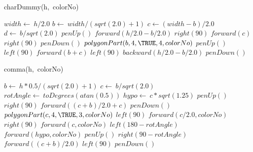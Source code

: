 \documentclass[a4paper,10pt]{article}
\begin{document}
\begin{algorithm}
\caption{charDummy(h,\ colorNo)}
\begin{algorithmic}[5]

\STATE {}
\STATE {}
  \STATE \(width\gets\ h/2.0\)
  \STATE \(b\gets\ width/(sqrt(2.0)+1)\)
  \STATE \(c\gets(width-b)/2.0\)
  \STATE \(d\gets\ b/sqrt(2.0)\)
  \STATE \(penUp()\)
  \STATE \(forward(h/2.0-b/2.0)\)
  \STATE \(right(90)\)
  \STATE \(forward(c)\)
  \STATE \(right(90)\)
  \STATE \(penDown()\)
  \STATE \(polygonPart(b,4,\TRUE,4,colorNo)\)
  \STATE \(penUp()\)
  \STATE \(left(90)\)
  \STATE \(forward(b+c)\)
  \STATE \(left(90)\)
  \STATE \(backward(h/2.0-b/2.0)\)
  \STATE \(penDown()\)

\end{algorithmic}
\end{algorithm}


\begin{algorithm}
\caption{comma(h,\ colorNo)}
\begin{algorithmic}[5]

\STATE {}
\STATE {}
  \STATE \(b\gets\ h*0.5/(sqrt(2.0)+1)\)
  \STATE \(c\gets\ b/sqrt(2.0)\)
  \STATE \(rotAngle\gets\ toDegrees(atan(0.5))\)
  \STATE \(hypo\gets\ c*sqrt(1.25)\)
  \STATE \(penUp()\)
  \STATE \(right(90)\)
  \STATE \(forward((c+b)/2.0+c)\)
  \STATE \(penDown()\)
  \STATE {}
  \STATE {}
  \STATE \(polygonPart(c,4,\TRUE,3,colorNo)\)
  \STATE \(left(90)\)
  \STATE \(forward(c/2.0,colorNo)\)
  \STATE \(right(90)\)
  \STATE \(forward(c,colorNo)\)
  \STATE \(left(180-rotAngle)\)
  \STATE \(forward(hypo,colorNo)\)
  \STATE \(penUp()\)
  \STATE \(right(90-rotAngle)\)
  \STATE \(forward((c+b)/2.0)\)
  \STATE \(left(90)\)
  \STATE \(penDown()\)

\end{algorithmic}
\end{algorithm}
\end{document}
